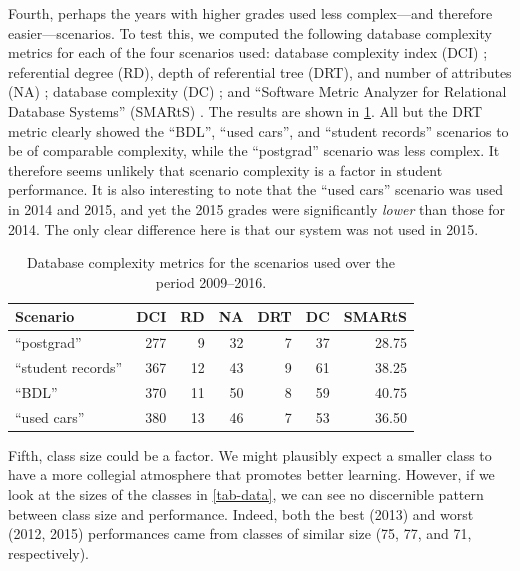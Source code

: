 \documentclass[sigconf, authordraft, capitalise]{acmart}
\begin{document}
Fourth, perhaps the years with higher grades used less complex---and therefore easier---scenarios. To test this, we computed the following database complexity metrics for each of the four scenarios used: database complexity index (DCI) \cite{Sinha.B-2014a-Estimation}; referential degree (RD), depth of referential tree (DRT), and number of attributes (NA) \cite{Calero.C-2001a-Database,Piattini.M-2001a-Table}; database complexity (DC) \cite{Pavlic.M-2008a-Database}; and ``Software Metric Analyzer for Relational Database Systems'' (SMARtS)
\cite{Jamil.B-2010a-SMARtS}. The results are shown in \cref{tab-metrics}. All but the DRT metric clearly showed the ``BDL'', ``used cars'', and ``student records'' scenarios to be of comparable complexity, while the ``postgrad'' scenario was less complex. It therefore seems unlikely that scenario complexity is a factor in student performance. It is also interesting to note that the ``used cars'' scenario was used in 2014 and 2015, and yet the 2015 grades were significantly \emph{lower} than those for 2014. The only clear difference here is that our system was not used in 2015.


\begin{table}
    \caption{Database complexity metrics for the scenarios used over the period 2009--2016.}
    \label{tab-metrics}
    \begin{tabular}{lrrrrrr}
        \toprule
            Scenario            &   DCI &   RD  &   NA  &   DRT &   DC  &   SMARtS  \\
            \midrule
            ``postgrad''        &   277 &   9   &   32  &   7   &   37  &   28.75   \\
            ``student records'' &   367 &   12  &   43  &   9   &   61  &   38.25   \\
            ``BDL''             &   370 &   11  &   50  &   8   &   59  &   40.75   \\
            ``used cars''       &   380 &   13  &   46  &   7   &   53  &   36.50    \\
        \bottomrule
    \end{tabular}
\end{table}


Fifth, class size could be a factor. We might plausibly expect a smaller class to have a more collegial atmosphere that promotes better learning. However, if we look at the sizes of the classes in \cref{tab-data}, we can see no discernible pattern between class size and performance. Indeed, both the best (2013) and worst (2012, 2015) performances came from classes of similar size (75, 77, and 71, respectively).
\end{document}

